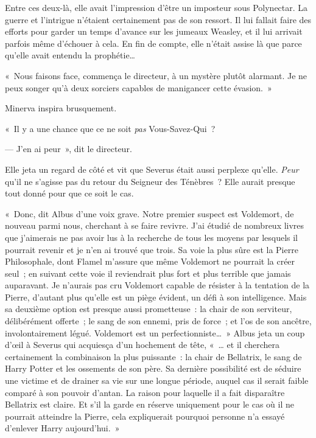 Entre ces deux-là, elle avait l'impression d'être un imposteur sous Polynectar. La guerre et l'intrigue n'étaient certainement pas de son ressort. Il lui fallait faire des efforts pour garder un temps d'avance sur les jumeaux Weasley, et il lui arrivait parfois même d'échouer à cela. En fin de compte, elle n'était assise là que parce qu'elle avait entendu la prophétie…

«~Nous faisons face, commença le directeur, à un mystère plutôt alarmant. Je ne peux songer qu'à deux sorciers capables de manigancer cette évasion.~»

Minerva inspira brusquement.

«~Il y a une chance que ce ne soit \emph{pas} Vous-Savez-Qui~?

--- J'en ai peur~», dit le directeur.

Elle jeta un regard de côté et vit que Severus était aussi perplexe qu'elle. \emph{Peur} qu'il ne s'agisse pas du retour du Seigneur des Ténèbres~? Elle aurait presque tout donné pour que ce soit le cas.

«~Donc, dit Albus d'une voix grave. Notre premier suspect est Voldemort, de nouveau parmi nous, cherchant à se faire revivre. J'ai étudié de nombreux livres que j'aimerais ne pas avoir lus à la recherche de tous les moyens par lesquels il pourrait revenir et je n'en ai trouvé que trois. Sa voie la plus sûre est la Pierre Philosophale, dont Flamel m'assure que même Voldemort ne pourrait la créer seul~; en suivant cette voie il reviendrait plus fort et plus terrible que jamais auparavant. Je n'aurais pas cru Voldemort capable de résister à la tentation de la Pierre, d'autant plus qu'elle est un piège évident, un défi à son intelligence. Mais sa deuxième option est presque aussi prometteuse~: la chair de son serviteur, délibérément offerte~; le sang de son ennemi, pris de force~; et l'os de son ancêtre, involontairement légué. Voldemort est un perfectionniste…~» Albus jeta un coup d'œil à Severus qui acquiesça d'un hochement de tête, «~… et il cherchera certainement la combinaison la plus puissante~: la chair de Bellatrix, le sang de Harry Potter et les ossements de son père. Sa dernière possibilité est de séduire une victime et de drainer sa vie sur une longue période, auquel cas il serait faible comparé à son pouvoir d'antan. La raison pour laquelle il a fait disparaître Bellatrix est claire. Et s'il la garde en réserve uniquement pour le cas où il ne pourrait atteindre la Pierre, cela expliquerait pourquoi personne n'a essayé d'enlever Harry aujourd'hui.~»

